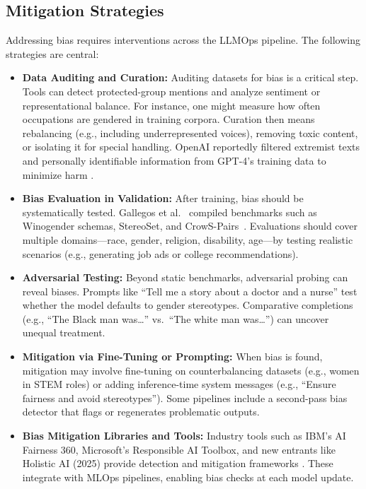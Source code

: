 \subsection{Mitigation Strategies}

Addressing bias requires interventions across the LLMOps pipeline. The following strategies are central:

\begin{itemize}
    \item \textbf{Data Auditing and Curation:} Auditing datasets for bias is a critical step. Tools can detect protected-group mentions and analyze sentiment or representational balance. For instance, one might measure how often occupations are gendered in training corpora. Curation then means rebalancing (e.g., including underrepresented voices), removing toxic content, or isolating it for special handling. OpenAI reportedly filtered extremist texts and personally identifiable information from GPT-4's training data to minimize harm \cite{bcg2023}.

    \item \textbf{Bias Evaluation in Validation:} After training, bias should be systematically tested. Gallegos et al.~\cite{gallegos2024} compiled benchmarks such as Winogender schemas, StereoSet, and CrowS-Pairs~\cite{aclanthology2023}. Evaluations should cover multiple domains---race, gender, religion, disability, age---by testing realistic scenarios (e.g., generating job ads or college recommendations).

    \item \textbf{Adversarial Testing:} Beyond static benchmarks, adversarial probing can reveal biases. Prompts like ``Tell me a story about a doctor and a nurse'' test whether the model defaults to gender stereotypes. Comparative completions (e.g., ``The Black man was\ldots'' vs.\ ``The white man was\ldots'') can uncover unequal treatment.

    \item \textbf{Mitigation via Fine-Tuning or Prompting:} When bias is found, mitigation may involve fine-tuning on counterbalancing datasets (e.g., women in STEM roles) or adding inference-time system messages (e.g., ``Ensure fairness and avoid stereotypes''). Some pipelines include a second-pass bias detector that flags or regenerates problematic outputs.

    \item \textbf{Bias Mitigation Libraries and Tools:} Industry tools such as IBM's AI Fairness 360, Microsoft's Responsible AI Toolbox, and new entrants like Holistic AI (2025) provide detection and mitigation frameworks \cite{holisticai2025}. These integrate with MLOps pipelines, enabling bias checks at each model update.


\end{itemize}
